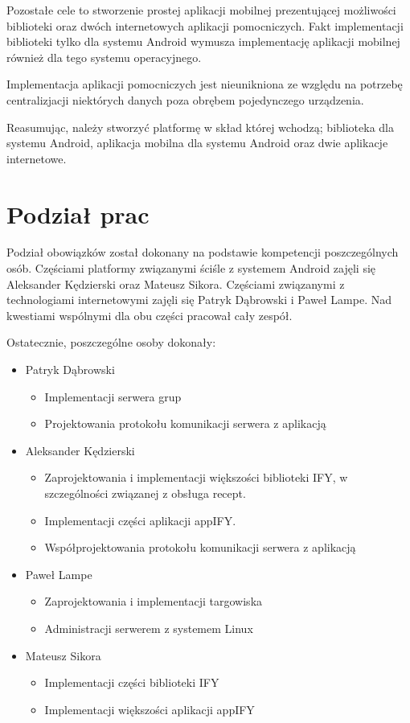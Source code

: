 \documentclass[11pt,a4paper,polish,thesis]{dcsbook}
\begin{document}
Pozostałe cele to stworzenie prostej aplikacji mobilnej prezentującej możliwości biblioteki oraz dwóch internetowych aplikacji pomocniczych. Fakt implementacji
biblioteki tylko dla systemu Android wymusza implementację aplikacji mobilnej również dla tego systemu operacyjnego.

Implementacja aplikacji pomocniczych jest nieunikniona ze względu na potrzebę centralizjacji niektórych danych poza obrębem pojedynczego urządzenia.

Reasumując, należy stworzyć platformę w skład której wchodzą; biblioteka dla systemu Android, aplikacja mobilna dla systemu Android oraz dwie aplikacje internetowe.
\section{Podział prac}
Podział obowiązków został dokonany na podstawie kompetencji poszczególnych osób. Częściami platformy związanymi ściśle z systemem Android zajęli się Aleksander
Kędzierski oraz Mateusz Sikora. Częściami związanymi z technologiami internetowymi zajęli się Patryk Dąbrowski i Paweł Lampe. Nad kwestiami wspólnymi dla obu części
pracował cały zespół.

Ostatecznie, poszczególne osoby dokonały:
\begin{itemize}
\item Patryk Dąbrowski
\begin{itemize}
\item Implementacji serwera grup
\item Projektowania protokołu komunikacji serwera z aplikacją
\end{itemize}
\item Aleksander Kędzierski
\begin{itemize}
\item Zaprojektowania i implementacji większości biblioteki IFY, w szczególności związanej z obsługa recept.
\item Implementacji części aplikacji appIFY.
\item Współprojektowania protokołu komunikacji serwera z aplikacją
\end{itemize}
\item Paweł Lampe
\begin{itemize}
\item Zaprojektowania i implementacji targowiska
\item Administracji serwerem z systemem Linux
\end{itemize}
\item Mateusz Sikora
\begin{itemize}
\item Implementacji części biblioteki IFY
\item Implementacji większości aplikacji appIFY
\end{itemize}
\end{itemize}
\end{document}
